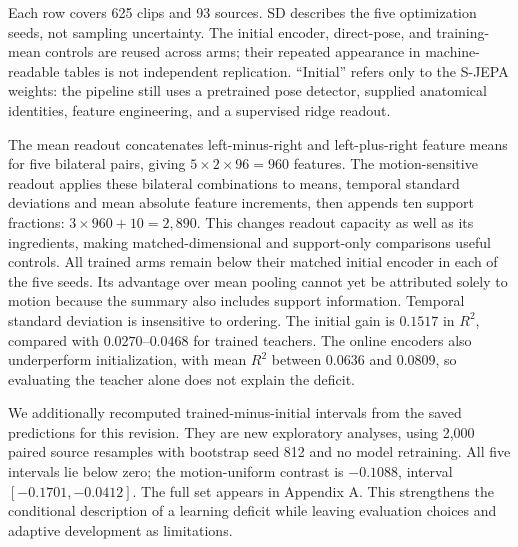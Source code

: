 \documentclass{article}
\begin{document}
Each row covers 625 clips and 93 sources. SD describes the five optimization seeds, not sampling uncertainty. The initial encoder, direct-pose, and training-mean controls are reused across arms; their repeated appearance in machine-readable tables is not independent replication. ``Initial'' refers only to the S-JEPA weights: the pipeline still uses a pretrained pose detector, supplied anatomical identities, feature engineering, and a supervised ridge readout.

The mean readout concatenates left-minus-right and left-plus-right feature means for five bilateral pairs, giving \(5\times2\times96=960\) features. The motion-sensitive readout applies these bilateral combinations to means, temporal standard deviations and mean absolute feature increments, then appends ten support fractions: \(3\times960+10=2,890\). This changes readout capacity as well as its ingredients, making matched-dimensional and support-only comparisons useful controls. All trained arms remain below their matched initial encoder in each of the five seeds. Its advantage over mean pooling cannot yet be attributed solely to motion because the summary also includes support information. Temporal standard deviation is insensitive to ordering. The initial gain is \(0.1517\) in \(R^2\), compared with \(0.0270\)--\(0.0468\) for trained teachers. The online encoders also underperform initialization, with mean \(R^2\) between 0.0636 and 0.0809, so evaluating the teacher alone does not explain the deficit.

We additionally recomputed trained-minus-initial intervals from the saved predictions for this revision. They are new exploratory analyses, using 2,000 paired source resamples with bootstrap seed 812 and no model retraining. All five intervals lie below zero; the motion-uniform contrast is \(-0.1088\), interval \([-0.1701,-0.0412]\). The full set appears in Appendix A. This strengthens the conditional description of a learning deficit while leaving evaluation choices and adaptive development as limitations.
\end{document}
